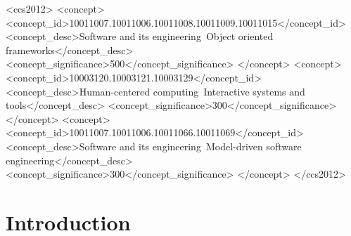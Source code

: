 \documentclass[sigplan,review,anonymous,10pt]{acmart}
\begin{document}
\begin{abstract}
We present Strvct, an open-source JavaScript framework built on this model-first architecture. Centralizing the model-to-view pipeline also yields capabilities that component frameworks usually pay for repeatedly: automatic responsive behavior, headless execution, annotation-driven persistence, cloud synchronization, inspection, accessibility hooks, internationalization, and AI operation. The same annotations that generate the human interface expose a constant-size agent tool surface that does not grow with the number of domain classes. A production application, undreamedof.ai, comprises roughly 90 domain classes with about 90\% framework-generated views; its remaining custom views are inherently graphical.
\end{abstract}

\begin{CCSXML}
<ccs2012>
   <concept>
       <concept_id>10011007.10011006.10011008.10011009.10011015</concept_id>
       <concept_desc>Software and its engineering~Object oriented frameworks</concept_desc>
       <concept_significance>500</concept_significance>
   </concept>
   <concept>
       <concept_id>10003120.10003121.10003129</concept_id>
       <concept_desc>Human-centered computing~Interactive systems and tools</concept_desc>
       <concept_significance>300</concept_significance>
   </concept>
   <concept>
       <concept_id>10011007.10011006.10011066.10011069</concept_id>
       <concept_desc>Software and its engineering~Model-driven software engineering</concept_desc>
       <concept_significance>300</concept_significance>
   </concept>
</ccs2012>
\end{CCSXML}



\maketitle

\section{Introduction}
\label{sec:intro}
\end{document}
